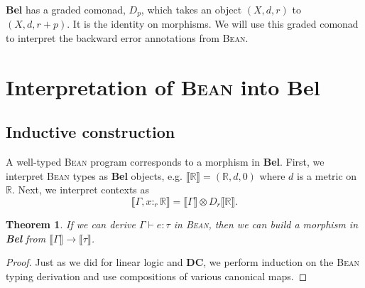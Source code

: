 \documentclass[a4paper]{article}
\newcommand{\DC}{\textbf{DC}}
\newcommand{\Bel}{\textbf{Bel}}
\newcommand{\Bean}{\textsc{Bean}}
\newcommand{\denot}[1]{\llbracket {#1} \rrbracket}
\newcommand{\R}{\mathbb{R}}
\newtheorem{theorem}{Theorem}
\begin{document}
\Bel{} has a graded comonad, $D_p$, which takes an object $(X,d,r)$ to $(X,d,r+p)$. It is the identity on morphisms. We will use this graded comonad to interpret the backward error annotations from \Bean{}.

\section{Interpretation of \Bean{} into \Bel{}}
\subsection{Inductive construction}
A well-typed \Bean{} program corresponds to a morphism in \Bel{}. First, we interpret \Bean{} types as \Bel{} objects, e.g. $\denot{\R}=(\R,d,0)$ where $d$ is a metric on $\R$. Next, we interpret contexts as 
\begin{equation*}
    \denot{\Gamma,x:_r\R}=\denot\Gamma\otimes D_r\denot\R.
\end{equation*}

\begin{theorem}
    If we can derive $\Gamma\vdash e:\tau$ in \Bean{}, then we can build a morphism in \Bel{} from $\denot\Gamma\to\denot\tau$.
\end{theorem} 
\begin{proof}
    Just as we did for linear logic and \DC{}, we perform induction on the \Bean{} typing derivation and use compositions of various canonical maps. 
\end{proof}
\end{document}
